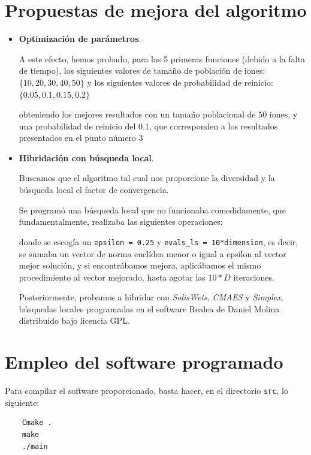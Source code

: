 \documentclass[a4paper,11pt]{article}
\begin{document}
\section{Propuestas de mejora del algoritmo}
\begin{itemize}
 \item \textbf{Optimización de parámetros}.
 
 A este efecto, hemos probado, para las 5 primeras funciones (debido a la falta de tiempo), los siguientes valores de tamaño
 de población de iones: $\big\{10, 20, 30, 40, 50\big\}$ y los siguientes valores de probabilidad de reinicio: $\big\{0.05, 0.1, 0.15, 0.2\big\}$
 
 obteniendo los mejores resultados con un tamaño poblacional de $50$ iones, y una probabilidad de reinicio del $0.1$, que corresponden
 a los resultados presentados en el punto número 3
 
 \item \textbf{Hibridación con búsqueda local}.
 
 Buscamos que el algoritmo tal cual nos proporcione la diversidad y la búsqueda local el factor de convergencia. 
 
 
 Se programó una búsqueda local que no funcionaba comedidamente, que fundamentalmente, realizaba las siguientes operaciones:
 
  \small{\texttt{}}
  \normalsize
  
  donde se escogía un \texttt{epsilon = 0.25} y \texttt{evals\_ls = 10*dimension}, es decir, se sumaba un vector de norma euclídea
  menor o igual a epsilon al vector mejor solución, y si encontrábamos mejora, aplicábamos el mismo procedimiento al vector mejorado,
  hasta agotar las $10*D$ iteraciones.
  
 Posteriormente, probamos a hibridar con \textit{SolisWets}, \textit{CMAES} y \textit{Simplex}, búsquedas locales programadas en el software Realea de Daniel Molina distribuido
 bajo licencia GPL.
\end{itemize}


\section{Empleo del software programado}

Para compilar el software proporcionado, basta hacer, en el directorio \texttt{src}, lo siguiente:

\begin{verbatim}
    Cmake .
    make
    ./main
\end{verbatim}
\end{document}
